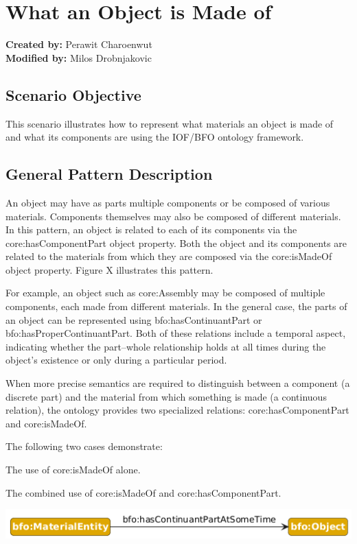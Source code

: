 \section{What an Object is Made of}
\label{chapter-scenario-template}

\textbf{Created by:} Perawit Charoenwut \\
\textbf{Modified by:} Milos Drobnjakovic

\subsection*{Scenario Objective}
This scenario illustrates how to represent what materials an object is made of and what its components are using the IOF/BFO ontology framework.

\subsection*{General Pattern Description}
An object may have as parts multiple components or be composed of various materials. Components themselves may also be composed of different materials. In this pattern, an object is related to each of its components via the core:hasComponentPart object property. Both the object and its components are related to the materials from which they are composed via the core:isMadeOf object property. Figure X illustrates this pattern.

For example, an object such as core:Assembly may be composed of multiple components, each made from different materials. In the general case, the parts of an object can be represented using bfo:hasContinuantPart or bfo:hasProperContinuantPart. Both of these relations include a temporal aspect, indicating whether the part–whole relationship holds at all times during the object’s existence or only during a particular period.

When more precise semantics are required to distinguish between a component (a discrete part) and the material from which something is made (a continuous relation), the ontology provides two specialized relations: core:hasComponentPart and core:isMadeOf.

The following two cases demonstrate:

The use of core:isMadeOf alone.

The combined use of core:isMadeOf and core:hasComponentPart.

\includegraphics[scale=0.5]{scenarios/object-artifact-material/image/what-is-made-of-schema.png}



